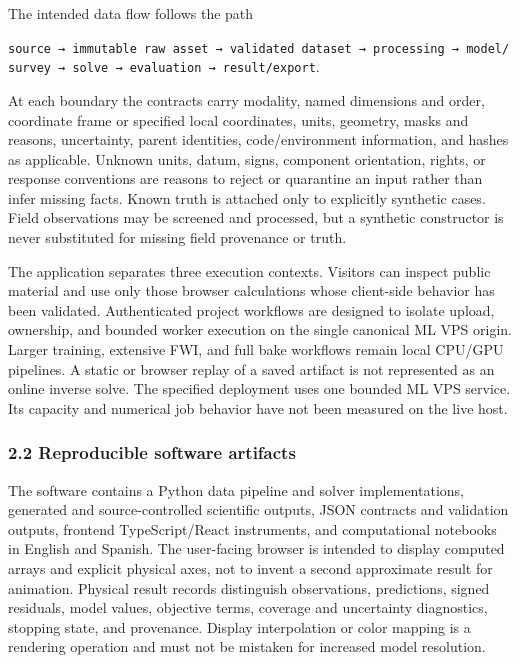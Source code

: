 The intended data flow follows the path

\texttt{source\ →\ immutable\ raw\ asset\ →\ validated\ dataset\ →\ processing\ →\ model/survey\ →\ solve\ →\ evaluation\ →\ result/export}.

At each boundary the contracts carry modality, named dimensions and
order, coordinate frame or specified local coordinates, units, geometry,
masks and reasons, uncertainty, parent identities, code/environment
information, and hashes as applicable. Unknown units, datum, signs,
component orientation, rights, or response conventions are reasons to
reject or quarantine an input rather than infer missing facts. Known
truth is attached only to explicitly synthetic cases. Field observations
may be screened and processed, but a synthetic constructor is never
substituted for missing field provenance or truth.

The application separates three execution contexts. Visitors can inspect
public material and use only those browser calculations whose
client-side behavior has been validated. Authenticated project workflows
are designed to isolate upload, ownership, and bounded worker execution
on the single canonical ML VPS origin. Larger training, extensive FWI,
and full bake workflows remain local CPU/GPU pipelines. A static or
browser replay of a saved artifact is not represented as an online
inverse solve. The specified deployment uses one bounded ML VPS service.
Its capacity and numerical job behavior have not been measured on the
live host.

\subsubsection{2.2 Reproducible software
artifacts}\label{reproducible-software-artifacts}

The software contains a Python data pipeline and solver implementations,
generated and source-controlled scientific outputs, JSON contracts and
validation outputs, frontend TypeScript/React instruments, and
computational notebooks in English and Spanish. The user-facing browser
is intended to display computed arrays and explicit physical axes, not
to invent a second approximate result for animation. Physical result
records distinguish observations, predictions, signed residuals, model
values, objective terms, coverage and uncertainty diagnostics, stopping
state, and provenance. Display interpolation or color mapping is a
rendering operation and must not be mistaken for increased model
resolution.

